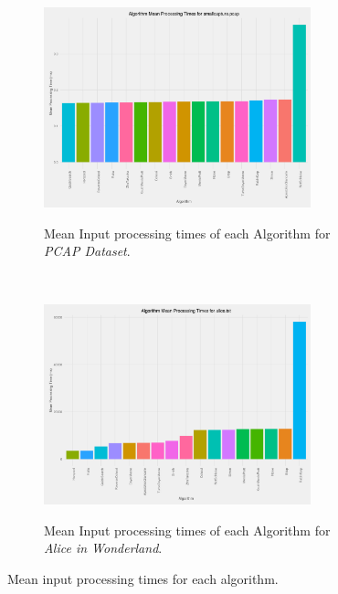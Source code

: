 \documentclass[11pt]{article}
\begin{document}
\begin{figure}[t]
    \centering
    \begin{subfigure}[b]{\textwidth}
        \centering
        \includegraphics[width=0.85\textwidth]{images/bar_graph_mean_one_input_smallcapture_pcap}
        \label{figure-barmeanprocessingsmallcapture}
        \caption{Mean Input processing times of each Algorithm for \textit{PCAP Dataset}.}
    \end{subfigure}
    ~
    \begin{subfigure}[b]{\textwidth}
        \centering
        \includegraphics[width=0.85\textwidth]{images/bar_graph_mean_one_input_alice_txt}
        \label{figure-barmeanprocessingalice}
        \caption{Mean Input processing times of each Algorithm for \textit{Alice in Wonderland}.}
    \end{subfigure}
    \caption{Mean input processing times for each algorithm.}
\end{figure}
\end{document}
